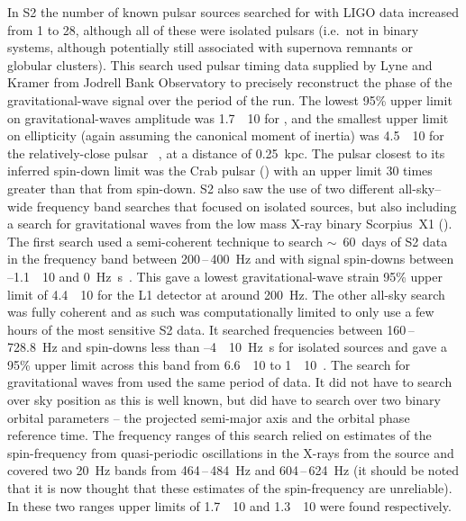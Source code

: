 \documentclass{article}
\begin{document}
In S2 the number of known pulsar sources searched for with LIGO data increased
from 1 to 28, although all of these were isolated pulsars (i.e.\, not in binary
systems, although potentially still associated with supernova remnants or
globular clusters). This search used pulsar timing data supplied by Lyne
and Kramer from Jodrell Bank Observatory to precisely reconstruct the
phase of the gravitational-wave signal over the period of the run. The lowest
95\% upper limit on gravitational-waves amplitude was
1.7~\texttimes~10 for , and the smallest
upper limit on ellipticity (again assuming the canonical moment of
inertia) was 4.5~\texttimes~10 for the relatively-close
pulsar ~\cite{Abbott:2005f}, at a distance of
0.25~kpc. The pulsar closest to its inferred spin-down limit was the
Crab pulsar () with an upper limit 30 times greater than
that from spin-down. S2 also saw the use of two different all-sky--wide
frequency band searches that focused on isolated sources, but also
including a search for gravitational waves from the low mass X-ray
binary Scorpius~X1 (). The first search used a semi-coherent
technique to search $\sim$~60~days of S2 data in the frequency band
between 200\,--\,400~Hz and with signal spin-downs between
--1.1~\texttimes~10 and
0~Hz~s~\cite{Abbott:2005g}. This gave a lowest gravitational-wave strain 95\% upper limit of 4.4~\texttimes~10 for the
L1 detector at around 200~Hz. The other all-sky search was fully
coherent and as such was computationally limited to only use a few
hours of the most sensitive S2 data. It searched frequencies between
160\,--\,728.8~Hz and spin-downs less than
--4~\texttimes~10~Hz~s for isolated sources and
gave a 95\% upper limit across this band from
6.6~\texttimes~10 to 1~\texttimes~10~\cite{Abbott:2007a}. The search for gravitational waves from  used the
same period of data. It did not have to search over sky position as this is well
known, but did have to search over two binary orbital parameters -- the projected
semi-major axis and the orbital phase reference time. The frequency ranges of
this search relied on estimates of the spin-frequency from quasi-periodic
oscillations in the X-rays from the source and covered two 20~Hz bands from
464\,--\,484~Hz and 604\,--\,624~Hz (it should be noted that it is now
thought that these estimates of the spin-frequency are unreliable). In
these two ranges upper limits of 1.7~\texttimes~10 and
1.3~\texttimes~10 were found respectively.
\end{document}
